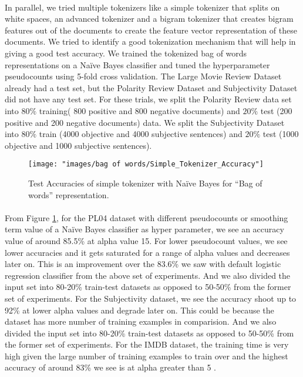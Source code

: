 \documentclass[a4paper,26pt]{article}
\begin{document}
\paragraph{}
In parallel, we tried multiple tokenizers like a simple tokenizer that splits on white spaces, an advanced tokenizer and a bigram tokenizer that creates bigram features out of the documents to create the feature vector representation of these documents. We tried to identify a good tokenization mechanism that will help in giving a good test accuracy. We trained the tokenized bag of words representations on a Na\"{i}ve Bayes classifier and tuned the hyperparameter pseudocounts using 5-fold cross validation. The Large Movie Review Dataset already had a test set, but the Polarity Review Dataset and Subjectivity Dataset did not have any test set. For these trials, we split the Polarity Review data set into $80\%$ training( 800 positive and 800 negative documents) and $20\%$ test (200 positive and 200 negative documents) data. We split the Subjectivity Dataset into $80\%$ train (4000 objective and 4000 subjective sentences) and $20\%$ test (1000 objective and 1000 subjective sentences).

\begin{figure}[H]
\centerline{\texttt{[image: "images/bag of words/Simple\_Tokenizer\_Accuracy"]}}
\caption{Test Accuracies of simple tokenizer with Na\"{i}ve Bayes for ``Bag of words'' representation.}
\label{fig:simpletok}
\end{figure}

\paragraph{}
From Figure \ref{fig:simpletok}, for the PL04 dataset with different pseudocounts or smoothing term value of a Na\"{i}ve Bayes classifier as  hyper parameter, we see an accuracy value of around 85.5\% at alpha value 15. For lower pseudocount values, we see lower accuracies and it gets saturated for a range of alpha values and decreases later on. This is an improvement over the 83.6\% we saw with default logistic regression classifier from the above set of experiments. And we also divided the input set into 80-20\% train-test datasets as opposed to 50-50\% from the former set of experiments. For the Subjectivity dataset, we see the accuracy shoot up to 92\% at lower alpha values and degrade later on. This could be because the dataset has more number of training examples in comparision. And we also divided the input set into 80-20\% train-test datasets as opposed to 50-50\% from the former set of experiments. For the IMDB dataset, the training time is very high given the large number of training examples to train over and the highest accuracy of around 83\% we see is at alpha greater than 5 . 
\end{document}
